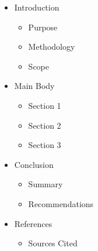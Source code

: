 \begin{itemize}
\item Introduction
  \begin{itemize}
  \item Purpose
  \item Methodology
  \item Scope
  \end{itemize}
\item Main Body
  \begin{itemize}
  \item Section 1
  \item Section 2
  \item Section 3
  \end{itemize}
\item Conclusion
  \begin{itemize}
  \item Summary
  \item Recommendations
  \end{itemize}
\item References
  \begin{itemize}
  \item Sources Cited
  \end{itemize}
\end{itemize}

\newpage


